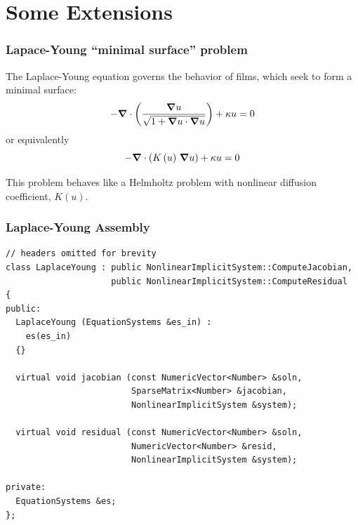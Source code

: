 \section{Some Extensions}






\frame
{
  \Large
  \begin{block}{}
  \end{block}
}

\frame
{
  \frametitle{Lapace-Young ``minimal surface'' problem}

  The Laplace-Young equation governs the behavior of films, which seek to form a minimal surface:
  \begin{equation*}
    -{\boldsymbol{\nabla}} {}\cdot\left(\frac{{\boldsymbol{\nabla}} {u}}{\sqrt{1 + {\boldsymbol{\nabla}} {u}\cdot{\boldsymbol{\nabla}} {u}}}\right) + \kappa u = 0
  \end{equation*}
  or equivalently
  \begin{equation*}
    -{\boldsymbol{\nabla}} {}\cdot\left(K\left(u\right)\,{\boldsymbol{\nabla}} {u}\right) + \kappa u = 0
  \end{equation*}
  
  This problem behaves like a Helmholtz problem with nonlinear diffusion coefficient, $K(u)$.
}

\begin{frame}
  \frametitle{Laplace-Young Assembly}
  \begin{lstlisting}
// headers omitted for brevity
class LaplaceYoung : public NonlinearImplicitSystem::ComputeJacobian,
                     public NonlinearImplicitSystem::ComputeResidual
{
public:  
  LaplaceYoung (EquationSystems &es_in) :
    es(es_in)
  {}

  virtual void jacobian (const NumericVector<Number> &soln,
                         SparseMatrix<Number> &jacobian,
                         NonlinearImplicitSystem &system);

  virtual void residual (const NumericVector<Number> &soln,
                         NumericVector<Number> &resid,
                         NonlinearImplicitSystem &system); 

private:
  EquationSystems &es;
};
  \end{lstlisting}
\end{frame}



